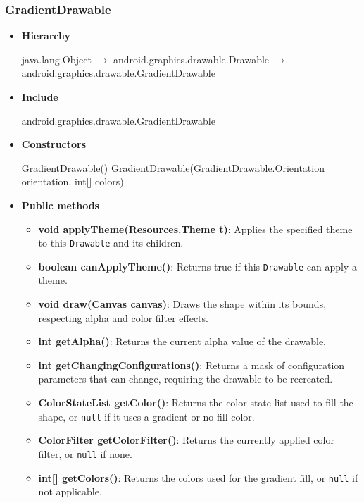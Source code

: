 \documentclass{report}
\begin{document}
    \subsubsection{GradientDrawable}
    \begin{itemize}
        \item \textbf{Hierarchy} 
            \begin{center}
                java.lang.Object $\to$	android.graphics.drawable.Drawable $\to$	android.graphics.drawable.GradientDrawable
            \end{center}
        \item \textbf{Include}
            \bigbreak \noindent 
            \begin{javacode}
                android.graphics.drawable.GradientDrawable
            \end{javacode}
        \item \textbf{Constructors}
            \bigbreak \noindent 
            \begin{javacode}
            GradientDrawable()
            GradientDrawable(GradientDrawable.Orientation orientation, int[] colors)
        \end{javacode}
    \item \textbf{Public methods}
        \begin{itemize}
            \item \textbf{void applyTheme(Resources.Theme t)}: Applies the specified theme to this \texttt{Drawable} and its children.
            \item \textbf{boolean canApplyTheme()}: Returns true if this \texttt{Drawable} can apply a theme.
            \item \textbf{void draw(Canvas canvas)}: Draws the shape within its bounds, respecting alpha and color filter effects.
            \item \textbf{int getAlpha()}: Returns the current alpha value of the drawable.
            \item \textbf{int getChangingConfigurations()}: Returns a mask of configuration parameters that can change, requiring the drawable to be recreated.
            \item \textbf{ColorStateList getColor()}: Returns the color state list used to fill the shape, or \texttt{null} if it uses a gradient or no fill color.
            \item \textbf{ColorFilter getColorFilter()}: Returns the currently applied color filter, or \texttt{null} if none.
            \item \textbf{int[] getColors()}: Returns the colors used for the gradient fill, or \texttt{null} if not applicable.

\end{itemize}
\end{itemize}
\end{document}
